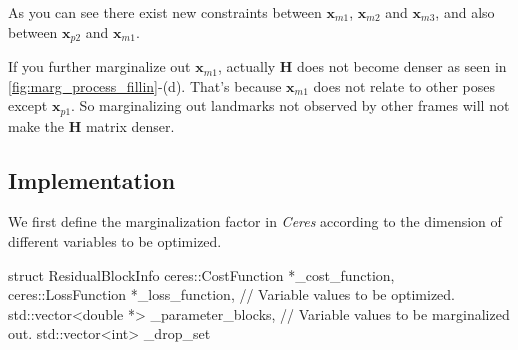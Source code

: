 \documentclass[12pt]{report}   %
\begin{document}
As you can see there exist new constraints between $\bm{x}_{m1}$, $\bm{x}_{m2}$ and $\bm{x}_{m3}$, and also between $\bm{x}_{p2}$ and $\bm{x}_{m1}$.

If you further marginalize out $\bm{x}_{m1}$, actually $\bm{H}$ does not become denser as seen in \ref{fig:marg_process_fillin}-(d). That's because $\bm{x}_{m1}$ does not relate to other poses except $\bm{x}_{p1}$. So marginalizing out landmarks not observed by other frames will not make the $\bm{H}$ matrix denser. 



\subsection{Implementation}


We first define the marginalization factor in \textit{Ceres} according to the dimension of different variables to be optimized.

\begin{cppcode}
struct ResidualBlockInfo{
ceres::CostFunction *_cost_function, 
ceres::LossFunction *_loss_function,
// Variable values to be optimized.
std::vector<double *> _parameter_blocks, 
// Variable values to be marginalized out.
std::vector<int> _drop_set}

\end{cppcode}
\end{document}
